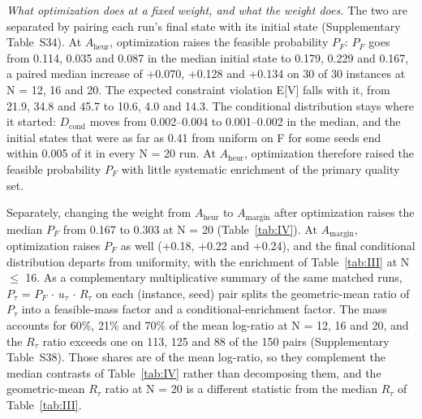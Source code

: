 \documentclass[journal]{IEEEtran}
\begin{document}
\textit{What optimization does at a fixed weight, and what the weight does.} The two are separated by pairing each run's final state with its initial state (Supplementary Table~S34). At $A_{\mathrm{heur}}$, optimization raises the feasible probability $P_{F}$: $P_{F}$ goes from 0.114, 0.035 and 0.087 in the median initial state to 0.179, 0.229 and 0.167, a paired median increase of +0.070, +0.128 and +0.134 on 30 of 30 instances at N = 12, 16 and 20. The expected constraint violation E[V] falls with it, from 21.9, 34.8 and 45.7 to 10.6, 4.0 and 14.3. The conditional distribution stays where it started: $D_{\mathrm{cond}}$ moves from 0.002--0.004 to 0.001--0.002 in the median, and the initial states that were as far as 0.41 from uniform on F for some seeds end within 0.005 of it in every N = 20 run. At $A_{\mathrm{heur}}$, optimization therefore raised the feasible probability $P_{F}$ with little systematic enrichment of the primary quality set.


Separately, changing the weight from $A_{\mathrm{heur}}$ to $A_{\mathrm{margin}}$ after optimization raises the median $P_{F}$ from 0.167 to 0.303 at N = 20 (Table~\ref{tab:IV}). At $A_{\mathrm{margin}}$, optimization raises $P_{F}$ as well (+0.18, +0.22 and +0.24), and the final conditional distribution departs from uniformity, with the enrichment of Table~\ref{tab:III} at N $\leq$ 16. As a complementary multiplicative summary of the same matched runs, $P_{\tau}$ = $P_{F}$ $\cdot$ $u_{\tau}$ $\cdot$ $R_{\tau}$ on each (instance, seed) pair splits the geometric-mean ratio of $P_{\tau}$ into a feasible-mass factor and a conditional-enrichment factor. The mass accounts for 60\%, 21\% and 70\% of the mean log-ratio at N = 12, 16 and 20, and the $R_{\tau}$ ratio exceeds one on 113, 125 and 88 of the 150 pairs (Supplementary Table~S38). Those shares are of the mean log-ratio, so they complement the median contrasts of Table~\ref{tab:IV} rather than decomposing them, and the geometric-mean $R_{\tau}$ ratio at N = 20 is a different statistic from the median $R_{\tau}$ of Table~\ref{tab:III}.
\end{document}
